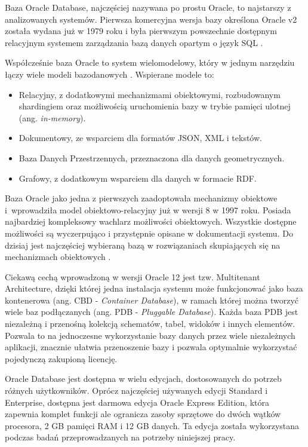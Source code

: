 \documentclass[a4paper,twoside,12pt]{book}
\begin{document}
Baza Oracle Database, najczęściej nazywana po prostu Oracle, to najstarszy z analizowanych systemów. Pierwsza komercyjna wersja bazy określona Oracle v2 została wydana już w 1979 roku i była pierwszym powszechnie dostępnym relacyjnym systemem zarządzania bazą danych opartym o język SQL \cite{bib:oracle-book}.

Współcześnie baza Oracle to system wielomodelowy, który w jednym narzędziu łączy wiele modeli bazodanowych \cite{bib:oracle-multimodel-database}. Wspierane modele to:
\begin{itemize}
\item Relacyjny, z dodatkowymi mechanizmami obiektowymi, rozbudowanym shardingiem oraz możliwością uruchomienia bazy w trybie pamięci ulotnej (ang. \textit{in-memory}).
\item Dokumentowy, ze wsparciem dla formatów JSON, XML i tekstów.
\item Baza Danych Przestrzennych, przeznaczona dla danych geometrycznych.
\item Grafowy, z dodatkowym wsparciem dla danych w formacie RDF.
\end{itemize}

Baza Oracle jako jedna z pierwszych zaadoptowała mechanizmy obiektowe i~wprowadziła model obiektowo-relacyjny już w wersji 8 w 1997 roku. Posiada najbardziej kompleksowy wachlarz możliwości obiektowych. Wszystkie dostępne możliwości są wyczerpująco i przystępnie opisane w dokumentacji systemu. Do dzisiaj jest najczęściej wybieraną bazą w rozwiązaniach skupiających się na mechanizmach obiektowych \cite{bib:oracle-database-concepts}.

Ciekawą cechą wprowadzoną w wersji Oracle 12 jest tzw. Multitenant Architecture, dzięki której jedna instalacja systemu może funkcjonować jako baza kontenerowa (ang. CBD - \textit{Container Database}), w ramach której można tworzyć wiele baz podłączanych (ang. PDB - \textit{Pluggable Database}). Każda baza PDB jest niezależną i przenośną kolekcją schematów, tabel, widoków i innych elementów. Pozwala to na jednoczesne wykorzystanie bazy danych przez wiele niezależnych aplikacji, znacznie ułatwia przenoszenie bazy i pozwala optymalnie wykorzystać pojedynczą zakupioną licencję.

Oracle Database jest dostępna w wielu edycjach, dostosowanych do potrzeb różnych użytkowników. Oprócz najczęściej używanych edycji Standard i Enterprise, dostępna jest darmowa edycja Oracle Express Edition, która zapewnia komplet funkcji ale ogranicza zasoby sprzętowe do dwóch wątków procesora, 2 GB pamięci RAM i 12 GB danych. Ta edycja została wykorzystana podczas badań przeprowadzanych na potrzeby niniejszej pracy.
\end{document}

